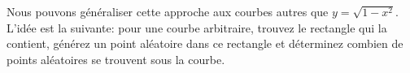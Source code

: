 \documentclass[%
oneside,                 %
final,                   %
10pt]{article}
\begin{document}
\vspace{6mm}



Nous pouvons généraliser cette approche aux courbes autres que $y = \sqrt{1-x^2}$. L'idée est la suivante: pour une courbe arbitraire, trouvez le rectangle qui la contient, générez un point aléatoire dans ce rectangle et déterminez combien de points aléatoires se trouvent sous la courbe.


\end{document}

